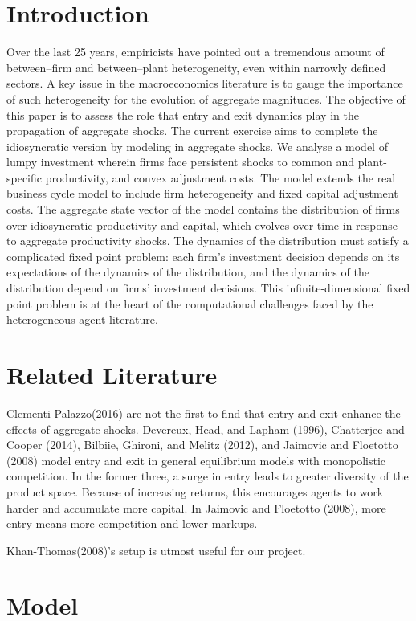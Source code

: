 \documentclass[]{article}
\begin{document}
\section{Introduction}
Over the last 25 years, empiricists have pointed out a tremendous amount of between–firm
and between–plant heterogeneity, even within narrowly defined sectors. A key issue in
the macroeconomics literature is to gauge the importance of such heterogeneity for the
evolution of aggregate magnitudes. The objective of this paper is to assess the role that
entry and exit dynamics play in the propagation of aggregate shocks. The current exercise aims to complete the idiosyncratic version by modeling in aggregate shocks.  We analyse a model of lumpy investment wherein firms face persistent shocks to common and plant-specific productivity, and convex adjustment costs. The model extends the real business cycle model to include firm heterogeneity and fixed capital adjustment costs. The aggregate state vector of the model contains the distribution of firms over idiosyncratic productivity and capital, which evolves over time in response to aggregate productivity shocks. The dynamics of the distribution must satisfy a complicated fixed point problem: each firm’s investment decision depends on its expectations of the dynamics of the distribution, and the dynamics of the distribution depend on firms’ investment decisions. This infinite-dimensional fixed point problem is at the heart of the computational challenges faced by the heterogeneous agent literature.

\section{Related Literature}
Clementi-Palazzo(2016) are not the first to find that entry and exit enhance
the effects of aggregate shocks. Devereux, Head, and Lapham (1996), Chatterjee and
Cooper (2014), Bilbiie, Ghironi, and Melitz (2012), and Jaimovic and Floetotto (2008)
model entry and exit in general equilibrium models with monopolistic competition. In the
former three, a surge in entry leads to greater diversity of the product space. Because of
increasing returns, this encourages agents to work harder and accumulate more capital. In
Jaimovic and Floetotto (2008), more entry means more competition and lower markups.

Khan-Thomas(2008)'s setup is utmost useful for our project.
\section{Model}
\end{document}
